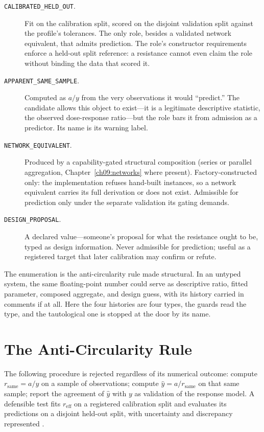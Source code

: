 \begin{description}
\item[\texttt{CALIBRATED\_HELD\_OUT}.] Fit on the calibration split,
scored on the disjoint validation split against the profile's tolerances.
The only role, besides a validated network equivalent, that admits
prediction. The role's constructor requirements enforce a held-out split
reference: a resistance cannot even claim the role without binding the
data that scored it.
\item[\texttt{APPARENT\_SAME\_SAMPLE}.] Computed as $a/y$ from the very
observations it would ``predict.'' The candidate allows this object to
exist---it is a legitimate descriptive statistic, the observed dose-response
ratio---but the role bars it from admission as a predictor. Its name is its
warning label.
\item[\texttt{NETWORK\_EQUIVALENT}.] Produced by a capability-gated
structural composition (series or parallel aggregation,
Chapter~\ref{ch09:networks} where present). Factory-constructed only: the
implementation refuses hand-built instances, so a network equivalent
carries its full derivation or does not exist. Admissible for prediction
only under the separate validation its gating demands.
\item[\texttt{DESIGN\_PROPOSAL}.] A declared value---someone's proposal for
what the resistance ought to be, typed as design information. Never
admissible for prediction; useful as a registered target that later
calibration may confirm or refute.
\end{description}

The enumeration is the anti-circularity rule made structural. In an untyped
system, the same floating-point number could serve as descriptive ratio,
fitted parameter, composed aggregate, and design guess, with its history
carried in comments if at all. Here the four histories are four types, the
guards read the type, and the tautological one is stopped at the door by
its name.

\section{The Anti-Circularity Rule}\label{ch06:anticirc}

\begin{ruleenv}\label{ch06:rule:anticirc}
The following procedure is rejected regardless of its numerical outcome:
compute $r_{\mathrm{same}} = a/y$ on a sample of observations; compute
$\hat y = a / r_{\mathrm{same}}$ on that same sample; report the agreement
of $\hat y$ with $y$ as validation of the response model. A defensible test
fits $r_{\mathrm{eff}}$ on a registered calibration split and evaluates its
predictions on a disjoint held-out split, with uncertainty and discrepancy
represented \cite{kennedyohagan}.
\end{ruleenv}

